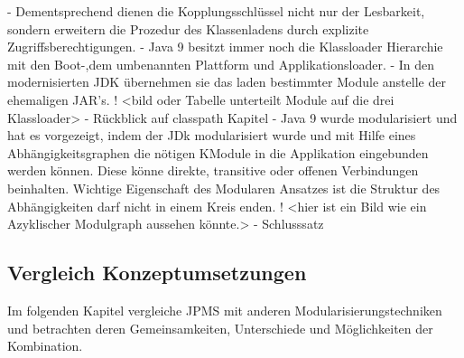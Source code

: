 - Dementsprechend dienen die Kopplungsschlüssel nicht nur der Lesbarkeit, sondern erweitern die Prozedur des Klassenladens durch explizite Zugriffsberechtigungen. 
- Java 9 besitzt immer noch die Klassloader Hierarchie mit den Boot-,dem umbenannten Plattform und Applikationsloader.
- In den modernisierten JDK  übernehmen sie das laden bestimmter Module anstelle der ehemaligen JAR's.
!  <bild oder Tabelle unterteilt Module auf die drei  Klassloader> 
- Rückblick auf classpath Kapitel 
- Java 9 wurde modularisiert und hat es vorgezeigt, indem der JDk modularisiert wurde und mit Hilfe eines Abhängigkeitsgraphen  die nötigen KModule in die Applikation eingebunden werden können. Diese könne direkte, transitive oder offenen Verbindungen beinhalten. Wichtige Eigenschaft des Modularen Ansatzes ist die Struktur des Abhängigkeiten darf nicht in einem Kreis enden.
! <hier ist ein Bild wie ein Azyklischer Modulgraph aussehen könnte.> 
- Schlusssatz 


\newpage \subsection{Vergleich Konzeptumsetzungen}
  Im folgenden Kapitel vergleiche JPMS mit anderen Modularisierungstechniken und betrachten deren Gemeinsamkeiten, Unterschiede und Möglichkeiten der Kombination. 

